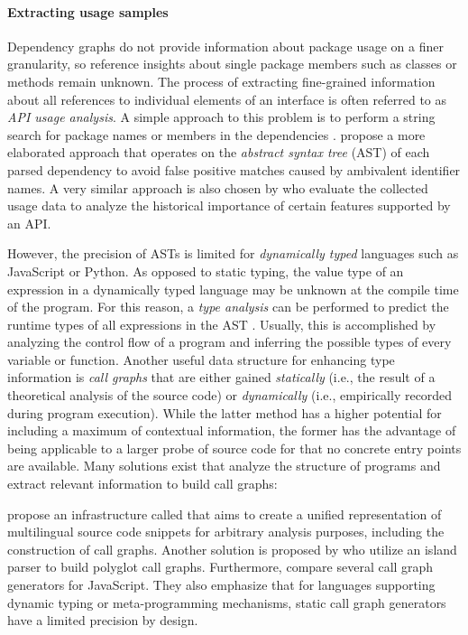 \paragraph{Extracting usage samples}
\label{sec:related_work/usage_samples}

Dependency graphs do not provide information about package usage on a finer granularity, so reference insights about single package members such as classes or methods remain unknown.
The process of extracting fine-grained information about all references to individual elements of an interface is often referred to as \emph{API usage analysis}.
A simple approach to this problem is to perform a string search for package names or members in the dependencies \citep{mileva2010mining}.
\citet{qiu2016understanding} propose a more elaborated approach that operates on the \emph{abstract syntax tree} (AST) of each parsed dependency to avoid false positive matches caused by ambivalent identifier names.
A very similar approach is also chosen by \citet{sawant2017fine} who evaluate the collected usage data to analyze the historical importance of certain features supported by an API.

However, the precision of ASTs is limited for \emph{dynamically typed} languages such as JavaScript or Python.
As opposed to static typing, the value type of an expression in a dynamically typed language may be unknown at the compile time of the program.
For this reason, a \emph{type analysis} can be performed to predict the runtime types of all expressions in the AST \citep{jensen2009type}.
Usually, this is accomplished by analyzing the control flow of a program and inferring the possible types of every variable or function.
Another useful data structure for enhancing type information is \emph{call graphs} that are either gained \emph{statically} (i.e., the result of a theoretical analysis of the source code) or \emph{dynamically} (i.e., empirically recorded during program execution).
While the latter method has a higher potential for including a maximum of contextual information, the former has the advantage of being applicable to a larger probe of source code for that no concrete entry points are available.
Many solutions exist that analyze the structure of programs and extract relevant information to build call graphs:

\citet{collard2013srcml} propose an infrastructure called  that aims to create a unified representation of multilingual source code snippets for arbitrary analysis purposes, including the construction of call graphs.
Another solution is proposed by \citet{bogar2018lightweight} who utilize an island parser to build polyglot call graphs.
Furthermore, \citet{antal2018static} compare several call graph generators for JavaScript.
They also emphasize that for languages supporting dynamic typing or meta-programming mechanisms, static call graph generators have a limited precision by design.

